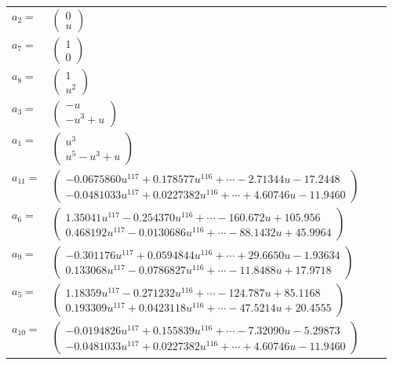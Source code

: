 \documentclass[1p]{elsarticle_modified}
\theoremstyle{definition}
\begin{document}
\begin{tabular}{m{7pt} m{180pt} m{7pt} m{180pt} }
\flushright $a_{2}=$&$\begin{pmatrix}0\\u\end{pmatrix}$ \\
\flushright $a_{7}=$&$\begin{pmatrix}1\\0\end{pmatrix}$ \\
\flushright $a_{8}=$&$\begin{pmatrix}1\\u^2\end{pmatrix}$ \\
\flushright $a_{3}=$&$\begin{pmatrix}- u\\- u^3+u\end{pmatrix}$ \\
\flushright $a_{1}=$&$\begin{pmatrix}u^3\\u^5- u^3+u\end{pmatrix}$ \\
\flushright $a_{11}=$&$\begin{pmatrix}-0.0675860 u^{117}+0.178577 u^{116}+\cdots-2.71344 u-17.2448\\-0.0481033 u^{117}+0.0227382 u^{116}+\cdots+4.60746 u-11.9460\end{pmatrix}$ \\
\flushright $a_{6}=$&$\begin{pmatrix}1.35041 u^{117}-0.254370 u^{116}+\cdots-160.672 u+105.956\\0.468192 u^{117}-0.0130686 u^{116}+\cdots-88.1432 u+45.9964\end{pmatrix}$ \\
\flushright $a_{9}=$&$\begin{pmatrix}-0.301176 u^{117}+0.0594844 u^{116}+\cdots+29.6650 u-1.93634\\0.133068 u^{117}-0.0786827 u^{116}+\cdots-11.8488 u+17.9718\end{pmatrix}$ \\
\flushright $a_{5}=$&$\begin{pmatrix}1.18359 u^{117}-0.271232 u^{116}+\cdots-124.787 u+85.1168\\0.193309 u^{117}+0.0423118 u^{116}+\cdots-47.5214 u+20.4555\end{pmatrix}$ \\
\flushright $a_{10}=$&$\begin{pmatrix}-0.0194826 u^{117}+0.155839 u^{116}+\cdots-7.32090 u-5.29873\\-0.0481033 u^{117}+0.0227382 u^{116}+\cdots+4.60746 u-11.9460\end{pmatrix}$ \\

\end{tabular}
\end{document}

